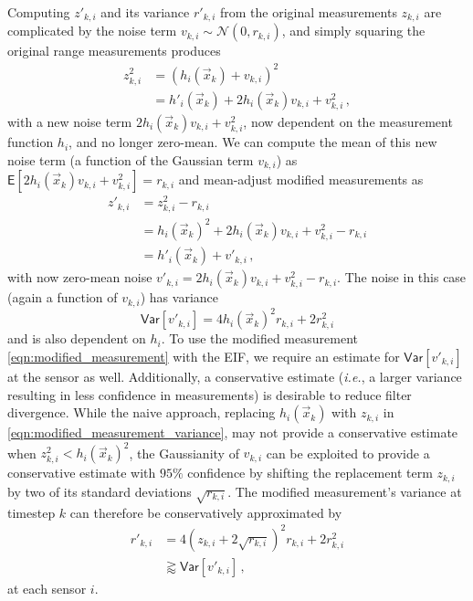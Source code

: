 \documentclass[10pt,letterpaper,oneside,twocolumn,journal]{IEEEtran}
\theoremstyle{definition}
\theoremstyle{definition}
\theoremstyle{remark}
\begin{document}
Computing $z'_{k,i}$ and its variance $r'_{k,i}$ from the original measurements $z_{k,i}$ are complicated by the noise term $v_{k,i} \sim \mathcal{N}(0, r_{k,i})$, and simply squaring the original range measurements produces
\begin{equation}
    \begin{split}
        z_{k,i}^2 &= (h_i(\vec{x}_k) + v_{k,i})^2 \\
        &= h'_i(\vec{x}_k) + 2h_i(\vec{x}_k)v_{k,i} + v_{k,i}^2\,,
    \end{split}
\end{equation}
with a new noise term $2h_i(\vec{x}_k)v_{k,i} + v_{k,i}^2$, now dependent on the measurement function $h_i$, and no longer zero-mean. We can compute the mean of this new noise term (a function of the Gaussian term $v_{k,i}$) as $\mathsf{E}[2h_i(\vec{x}_k)v_{k,i} + v_{k,i}^2] = r_{k,i}$ and mean-adjust modified measurements as
\begin{equation}
    \begin{split}
        z'_{k,i} &= z_{k,i}^2 - r_{k,i} \\
        &= h_i(\vec{x}_k)^2 + 2h_i(\vec{x}_k)v_{k,i} + v_{k,i}^2 - r_{k,i} \\
        &= h'_i(\vec{x}_k) + v'_{k,i}\,,
    \end{split} \label{eqn:modified_measurement}
\end{equation}
with now zero-mean noise $v'_{k,i} = 2h_i(\vec{x}_k)v_{k,i} + v_{k,i}^2 - r_{k,i}$. The noise in this case (again a function of $v_{k,i}$) has variance 
\begin{equation}
    \mathsf{Var}[v'_{k,i}] = 4h_i(\vec{x}_k)^2r_{k,i} + 2r_{k,i}^2 \label{eqn:modified_measurement_variance}
\end{equation}
and is also dependent on $h_i$. To use the modified measurement \eqref{eqn:modified_measurement} with the EIF, we require an estimate for $\mathsf{Var}[v'_{k,i}]$ at the sensor as well. Additionally, a conservative estimate (\textit{i.e.}, a larger variance resulting in less confidence in measurements) is desirable to reduce filter divergence. While the naive approach, replacing $h_i(\vec{x}_k)$ with $z_{k,i}$ in \eqref{eqn:modified_measurement_variance}, may not provide a conservative estimate when $z_{k,i}^2 < h_i(\vec{x}_k)^2$, the Gaussianity of $v_{k,i}$ can be exploited to provide a conservative estimate with $95\%$ confidence by shifting the replacement term $z_{k,i}$ by two of its standard deviations $\sqrt{r_{k,i}}$. The modified measurement's variance at timestep $k$ can therefore be conservatively approximated by
\begin{equation}
    \begin{split}
        r'_{k, i} &= 4(z_{k,i} + 2\sqrt{r_{k,i}})^2r_{k,i} + 2r_{k,i}^2 \\
        &\gtrapprox \mathsf{Var}[v'_{k,i}]\,,
    \end{split} \label{eqn:modified_measurement_variance_estimate}
\end{equation}
at each sensor $i$.
\end{document}
